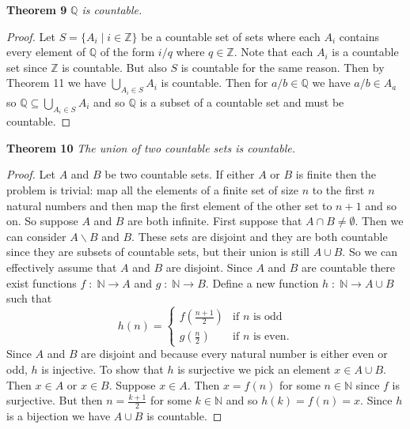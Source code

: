 \documentclass{article}
\begin{document}
\begin{flushleft}
\textbf{Theorem 9}
\textsl{$\mathbb{Q}$ is countable.}
\begin{proof}
Let $S= \{ A_i \mid i \in \mathbb{Z} \}$ be a countable set of sets where each $A_i$ contains every element of $\mathbb{Q}$ of the form $i/q$ where $q \in \mathbb{Z}$. Note that each $A_i$ is a countable set since $\mathbb{Z}$ is countable. But also $S$ is countable for the same reason. Then by Theorem 11 we have $\bigcup_{A_i \in S} A_i$ is countable. Then for $a/b \in \mathbb{Q}$ we have $a/b \in A_a$ so $\mathbb{Q} \subseteq \bigcup_{A_i \in S} A_i$ and so $\mathbb{Q}$ is a subset of a countable set and must be countable.
\end{proof}

\textbf{Theorem 10}
\textsl{The union of two countable sets is countable.}
\begin{proof}
Let $A$ and $B$ be two countable sets. If either $A$ or $B$ is finite then the problem is trivial: map all the elements of a finite set of size $n$ to the first $n$ natural numbers and then map the first element of the other set to $n+1$ and so on. So suppose $A$ and $B$ are both infinite. First suppose that $A \cap B \neq \emptyset$. Then we can consider $A \backslash B$ and $B$. These sets are disjoint and they are both countable since they are subsets of countable sets, but their union is still $A \cup B$. So we can effectively assume that $A$ and $B$ are disjoint. Since $A$ and $B$ are countable there exist functions $f \; : \; \mathbb{N} \rightarrow A$ and $g \; : \; \mathbb{N} \rightarrow B$. Define a new function $h \; : \; \mathbb{N} \rightarrow A \cup B$ such that
\[
h(n)=
\begin{cases}
f(\frac{n+1}{2}) & \text{if $n$ is odd} \\
g(\frac{n}{2}) & \text{if $n$ is even}.
\end{cases}
\]
Since $A$ and $B$ are disjoint and because every natural number is either even or odd, $h$ is injective. To show that $h$ is surjective we pick an element $x \in A \cup B$. Then $x \in A$ or $x \in B$. Suppose $x \in A$. Then $x = f(n)$ for some $n \in \mathbb{N}$ since $f$ is surjective. But then $n=\frac{k+1}{2}$ for some $k \in \mathbb{N}$ and so $h(k)=f(n)=x$. Since $h$ is a bijection we have $A \cup B$ is countable.
\end{proof}


\end{flushleft}
\end{document}
